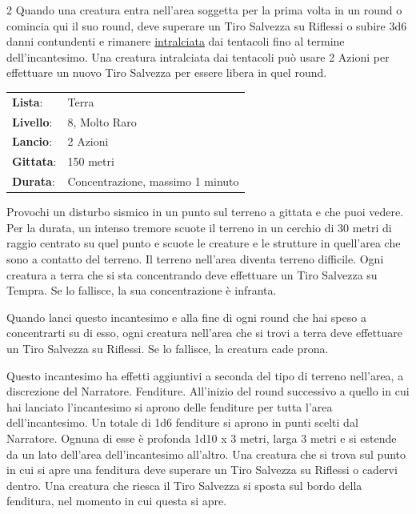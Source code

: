 \begin{multicols}{2}
Quando una creatura entra nell'area soggetta per la prima volta in un round o comincia qui il suo round, deve superare un Tiro Salvezza su Riflessi o subire 3d6 danni contundenti e rimanere \hyperlink{intralciato}{intralciata} dai tentacoli fino al termine dell'incantesimo. Una creatura intralciata dai tentacoli può usare 2 Azioni per effettuare un nuovo Tiro Salvezza per essere libera in quel round.

\noindent\begin{tabularx}{\linewidth}{p{1.9cm}X}
	\rowcolor{gray!20}\textbf{Lista}: & Terra \\
	\textbf{Livello}: & 8, Molto Raro \\
	\rowcolor{gray!20}\textbf{Lancio}: & 2 Azioni \\
	\textbf{Gittata}: & 150 metri \\
	\rowcolor{gray!20}\textbf{Durata}: & Concentrazione, massimo 1 minuto \\
\end{tabularx}\smallskip

Provochi un disturbo sismico in un punto sul terreno a gittata e che puoi vedere. Per la durata, un intenso tremore scuote il terreno in un cerchio di 30 metri di raggio centrato su quel punto e scuote le creature e le strutture in quell'area che sono a contatto del terreno. Il terreno nell'area diventa terreno difficile. Ogni creatura a terra che si sta concentrando deve effettuare un Tiro Salvezza su Tempra. Se lo fallisce, la sua concentrazione è infranta.

Quando lanci questo incantesimo e alla fine di ogni round che hai speso a concentrarti su di esso, ogni creatura nell'area che si trovi a terra deve effettuare un Tiro Salvezza su Riflessi. Se lo fallisce, la creatura cade prona.

Questo incantesimo ha effetti aggiuntivi a seconda del tipo di terreno nell'area, a discrezione del Narratore. Fenditure. All'inizio del round successivo a quello in cui hai lanciato l'incantesimo si aprono delle fenditure per tutta l'area dell'incantesimo. Un totale di 1d6 fenditure si aprono in punti scelti dal Narratore. Ognuna di esse è profonda 1d10 x 3 metri, larga 3 metri e si estende da un lato dell'area dell'incantesimo all'altro. Una creatura che si trova sul punto in cui si apre una fenditura deve superare un Tiro Salvezza su Riflessi o cadervi dentro. Una creatura che riesca il Tiro Salvezza si sposta sul bordo della fenditura, nel momento in cui questa si apre.


\end{multicols}
